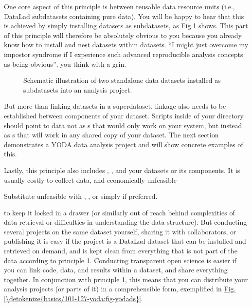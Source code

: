 \sphinxAtStartPar
One core aspect of this principle is  between reusable data
resource units (i.e., DataLad subdatasets containing pure data). You will
be happy to hear that this is achieved by simply installing datasets
as subdatasets, as \hyperref[\detokenize{basics/101-127-yoda:fig-subds}]{Fig.\@ \ref{\detokenize{basics/101-127-yoda:fig-subds}}} shows.
This part of this principle will therefore be absolutely obvious to you
because you already know how to install and nest datasets within datasets.
“I might just overcome my impostor syndrome if I experience such advanced
reproducible analysis concepts as being obvious”, you think with a grin.

\begin{figure}[tbp]
\centering
\capstart

\noindent{}
\caption{Schematic illustration of two standalone data datasets installed as subdatasets
into an analysis project.}\label{\detokenize{basics/101-127-yoda:id6}}\label{\detokenize{basics/101-127-yoda:fig-subds}}\end{figure}

\sphinxAtStartPar
But more than linking datasets in a superdataset, linkage also needs to
be established between components of your dataset. Scripts inside of
your  directory should point to data not as {\hyperref[\detokenize{glossary:term-absolute-path}]{}}s
that would only work on your system, but instead as {\hyperref[\detokenize{glossary:term-relative-path}]{}}s
that will work in any shared copy of your dataset. The next section
demonstrates a YODA data analysis project and will show concrete examples of this.

\sphinxAtStartPar
Lastly, this principle also includes , , and  your
datasets or its components.
It is usually costly to collect data, and economically unfeasible%
\begin{footnote}\sphinxAtStartFootnote
Substitute unfeasible with , , or simply  if preferred.
%
\end{footnote} to keep
it locked in a drawer (or similarly out of reach behind complexities of
data retrieval or difficulties in understanding the data structure).
But conducting several projects on the same dataset yourself, sharing it with
collaborators, or publishing it is easy if the project is a DataLad dataset
that can be installed and retrieved on demand, and is kept clean from
everything that is not part of the data according to principle 1.
Conducting transparent open science is easier if you can link code, data,
and results within a dataset, and share everything together. In conjunction
with principle 1, this means that you can distribute your analysis projects
(or parts of it) in a comprehensible form, exemplified in \hyperref[\detokenize{basics/101-127-yoda:fig-yodads}]{Fig.\@ \ref{\detokenize{basics/101-127-yoda:fig-yodads}}}.

